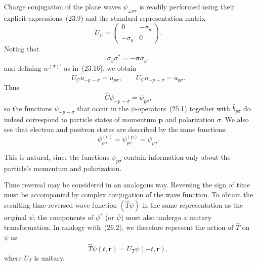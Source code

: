 Charge conjugation of the plane waves $\psi_{\pm p\sigma}$ is readily performed using their explicit expressions~(23.9) and the standard-representation matrix
\begin{equation}
U_C = \begin{pmatrix} 0 & -\sigma_y\\ -\sigma_y & 0 \end{pmatrix}.
\tag{26.8}
\end{equation}
Noting that
\[
\sigma_y\sigma^* = -\boldsymbol{\sigma}\sigma_y,
\]
and defining $w^{(\sigma)\prime}$ as in~(23.16), we obtain
\begin{equation}
U_C\widetilde{\bar u}_{-p\,-\sigma} = u_{p\sigma},\qquad
U_C u_{-p\,-\sigma} = \widetilde{\bar u}_{p\sigma}.
\tag{26.9}
\end{equation}
Thus
\begin{equation}
\widehat C\psi_{-p\,-\sigma} = \psi_{p\sigma},
\tag{26.10}
\end{equation}
so the functions $\psi_{-p\,-\sigma}$ that occur in the $\psi$-operators~(25.1) together with $\widehat b_{p\sigma}$ do indeed correspond to particle states of momentum $\mathbf{p}$ and polarization $\sigma$. We also see that electron and positron states are described by the same functions:
\[
\psi^{(\text{e})}_{p\sigma} = \psi^{(\text{p})}_{p\sigma} = \psi_{p\sigma}.
\]

This is natural, since the functions $\psi_{p\sigma}$ contain information only about the particle's momentum and polarization.

Time reversal may be considered in an analogous way. Reversing the sign of time must be accompanied by complex conjugation of the wave function. To obtain the resulting time-reversed wave function $(\widehat T\psi)$ in the same representation as the original $\psi$, the components of $\psi^*$ (or $\bar\psi$) must also undergo a unitary transformation. In analogy with~(26.2), we therefore represent the action of $\widehat T$ on $\psi$ as
\begin{equation}
\widehat T\psi(t,\mathbf{r}) = U_T\widetilde{\bar\psi}(-t,\mathbf{r}),
\tag{26.11}
\end{equation}
where $U_T$ is unitary.

